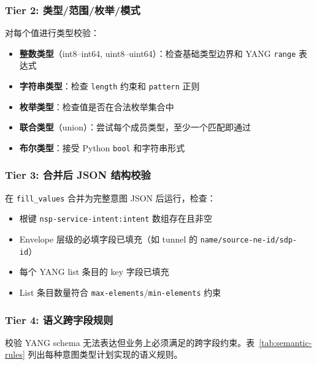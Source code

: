 \documentclass[12pt, a4paper]{article}
\newcommand{\yang}{\textsc{YANG}}
\newcommand{\fillvalues}{\texttt{fill\_values}}
\begin{document}
\subsubsection{Tier 2: 类型/范围/枚举/模式}

对每个值进行类型校验：

\begin{itemize}
  \item \textbf{整数类型}（int8--int64, uint8--uint64）：检查基础类型边界和 \yang{} \texttt{range} 表达式
  \item \textbf{字符串类型}：检查 \texttt{length} 约束和 \texttt{pattern} 正则
  \item \textbf{枚举类型}：检查值是否在合法枚举集合中
  \item \textbf{联合类型}（union）：尝试每个成员类型，至少一个匹配即通过
  \item \textbf{布尔类型}：接受 Python \texttt{bool} 和字符串形式
\end{itemize}

\subsubsection{Tier 3: 合并后 JSON 结构校验}

在 \fillvalues{} 合并为完整意图 JSON 后运行，检查：

\begin{itemize}
  \item 根键 \texttt{nsp-service-intent:intent} 数组存在且非空
  \item Envelope 层级的必填字段已填充（如 tunnel 的 \texttt{name/source-ne-id/sdp-id}）
  \item 每个 \yang{} list 条目的 key 字段已填充
  \item List 条目数量符合 \texttt{max-elements}/\texttt{min-elements} 约束
\end{itemize}

\subsubsection{Tier 4: 语义跨字段规则}

校验 \yang{} schema 无法表达但业务上必须满足的跨字段约束。表~\ref{tab:semantic-rules} 列出每种意图类型计划实现的语义规则。
\end{document}

